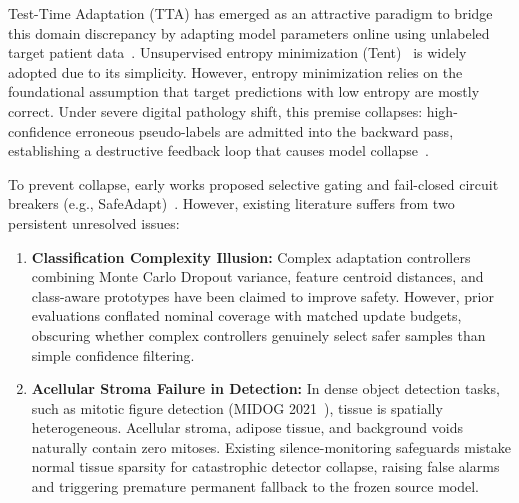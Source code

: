 \documentclass[conference]{IEEEtran}
\begin{document}
Test-Time Adaptation (TTA) has emerged as an attractive paradigm to bridge this domain discrepancy by adapting model parameters online using unlabeled target patient data~\cite{wang2021tent,liang2023comprehensive}. Unsupervised entropy minimization (Tent)~\cite{wang2021tent} is widely adopted due to its simplicity. However, entropy minimization relies on the foundational assumption that target predictions with low entropy are mostly correct. Under severe digital pathology shift, this premise collapses: high-confidence erroneous pseudo-labels are admitted into the backward pass, establishing a destructive feedback loop that causes model collapse~\cite{histopathc2026}.

To prevent collapse, early works proposed selective gating and fail-closed circuit breakers (e.g., SafeAdapt)~\cite{niu2022eata,niu2023sar}. However, existing literature suffers from two persistent unresolved issues:
\begin{enumerate}
    \item \textbf{Classification Complexity Illusion:} Complex adaptation controllers combining Monte Carlo Dropout variance, feature centroid distances, and class-aware prototypes have been claimed to improve safety. However, prior evaluations conflated nominal coverage with matched update budgets, obscuring whether complex controllers genuinely select safer samples than simple confidence filtering.
    \item \textbf{Acellular Stroma Failure in Detection:} In dense object detection tasks, such as mitotic figure detection (MIDOG 2021~\cite{aubreville2023mitosis}), tissue is spatially heterogeneous. Acellular stroma, adipose tissue, and background voids naturally contain zero mitoses. Existing silence-monitoring safeguards mistake normal tissue sparsity for catastrophic detector collapse, raising false alarms and triggering premature permanent fallback to the frozen source model.
\end{enumerate}
\end{document}
